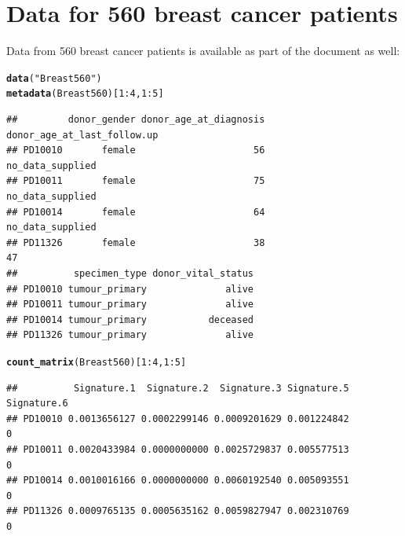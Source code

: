 \documentclass{article}\usepackage[]{graphicx}\usepackage[]{color}
\makeatletter
\newcommand{\hlnum}[1]{\textcolor[rgb]{0.686,0.059,0.569}{#1}}%
\newcommand{\hlstr}[1]{\textcolor[rgb]{0.192,0.494,0.8}{#1}}%
\newcommand{\hlopt}[1]{\textcolor[rgb]{0,0,0}{#1}}%
\newcommand{\hlstd}[1]{\textcolor[rgb]{0.345,0.345,0.345}{#1}}%
\newcommand{\hlkwd}[1]{\textcolor[rgb]{0.737,0.353,0.396}{\textbf{#1}}}%
\newenvironment{kframe}{%
 \def\at@end@of@kframe{}%
 \ifinner\ifhmode%
  \def\at@end@of@kframe{\end{minipage}}%
  \begin{minipage}{\columnwidth}%
 \fi\fi%
 \def\FrameCommand##1{\hskip\@totalleftmargin \hskip-\fboxsep
 \colorbox{shadecolor}{##1}\hskip-\fboxsep
     \hskip-\linewidth \hskip-\@totalleftmargin \hskip\columnwidth}%
 \MakeFramed {\advance\hsize-\width
   \@totalleftmargin\z@ \linewidth\hsize
   \@setminipage}}%
 {\par\unskip\endMakeFramed%
 \at@end@of@kframe}
\newenvironment{knitrout}{}{} %
\makeatother
\begin{document}
\section{Data for 560 breast cancer patients}
Data from 560 breast cancer patients is available as part of the document as well:

\begin{knitrout}
\color{fgcolor}\begin{kframe}
\begin{alltt}
\hlkwd{data}\hlstd{(}\hlstr{"Breast560"}\hlstd{)}
\hlkwd{metadata}\hlstd{(Breast560)[}\hlnum{1}\hlopt{:}\hlnum{4}\hlstd{,}\hlnum{1}\hlopt{:}\hlnum{5}\hlstd{]}
\end{alltt}
\begin{verbatim}
##         donor_gender donor_age_at_diagnosis donor_age_at_last_follow.up
## PD10010       female                     56            no_data_supplied
## PD10011       female                     75            no_data_supplied
## PD10014       female                     64            no_data_supplied
## PD11326       female                     38                          47
##          specimen_type donor_vital_status
## PD10010 tumour_primary              alive
## PD10011 tumour_primary              alive
## PD10014 tumour_primary           deceased
## PD11326 tumour_primary              alive
\end{verbatim}
\begin{alltt}
\hlkwd{count_matrix}\hlstd{(Breast560)[}\hlnum{1}\hlopt{:}\hlnum{4}\hlstd{,}\hlnum{1}\hlopt{:}\hlnum{5}\hlstd{]}
\end{alltt}
\begin{verbatim}
##          Signature.1  Signature.2  Signature.3 Signature.5 Signature.6
## PD10010 0.0013656127 0.0002299146 0.0009201629 0.001224842           0
## PD10011 0.0020433984 0.0000000000 0.0025729837 0.005577513           0
## PD10014 0.0010016166 0.0000000000 0.0060192540 0.005093551           0
## PD11326 0.0009765135 0.0005635162 0.0059827947 0.002310769           0
\end{verbatim}
\end{kframe}
\end{knitrout}
\end{document}
